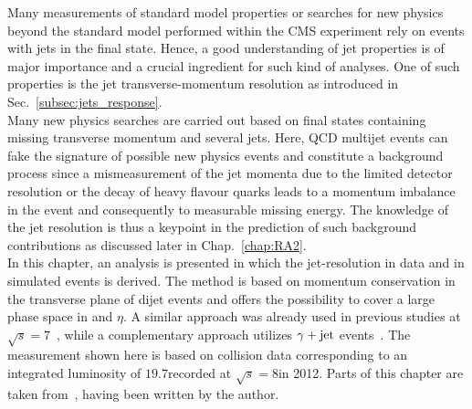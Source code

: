 Many measurements of standard model properties or searches for new physics beyond the standard model performed within the CMS experiment rely on events with jets in the final state. Hence, a good understanding of jet properties is of major importance and a crucial ingredient for such kind of analyses. One of such properties is the jet transverse-momentum resolution as introduced in Sec.~\ref{subsec:jets_response}. \\
Many new physics searches are carried out based on final states containing missing transverse momentum and several jets. Here, QCD multijet events can fake the signature of possible new physics events and constitute a background process since a mismeasurement of the jet momenta due to the limited detector resolution or the decay of heavy flavour quarks leads to a momentum imbalance in the event and consequently to measurable missing energy. The knowledge of the jet resolution is thus a keypoint in the prediction of such background contributions as discussed later in Chap.~\ref{chap:RA2}. \\
In this chapter, an analysis is presented in which the jet-\pt resolution in data and in simulated events is derived. The method is based on momentum conservation in the transverse plane of dijet events and offers the possibility to cover a large phase space in \pt and $\eta$. A similar approach was already used in previous studies at $\sqrt{s}=7$\tev~\cite{1748-0221-6-11-P11002, thesis:Schroeder}, while a complementary approach utilizes $\gamma +\rm{jet}$ events~\cite{1748-0221-6-11-P11002, CMS-AN-2010-141, CMS-AN-2011-004, CMS-AN-2013-179}. The measurement shown here is based on collision data corresponding to an integrated luminosity of $19.7$\fbinv recorded at $\sqrt{s}=8$\tev in 2012. Parts of this chapter are taken from~\cite{bib:AN2013-416}, having been written by the author.   

